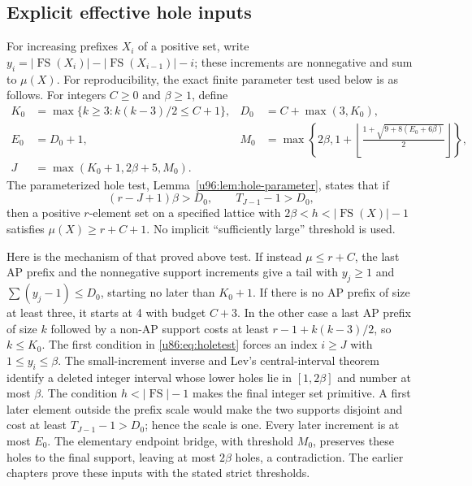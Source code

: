 \documentclass[11pt,a4paper]{article}
\theoremstyle{remark}
\newcommand{\FS}{\operatorname{FS}}
\begin{document}
\subsection{Explicit effective hole inputs}
For increasing prefixes $X_i$ of a positive set, write
$y_i=|\FS(X_i)|-|\FS(X_{i-1})|-i$; these increments are nonnegative
and sum to $\mu(X)$. For reproducibility, the exact finite parameter
test used below is as follows. For integers $C\ge0$ and $\beta\ge1$, define
\begin{align*}
 K_0&=\max\{k\ge3:k(k-3)/2\le C+1\},&D_0&=C+\max(3,K_0),\\
 E_0&=D_0+1,&
 M_0&=\max\left\{2\beta,1+\left\lfloor
 \frac{1+\sqrt{9+8(E_0+6\beta)}}2\right\rfloor\right\},\\
 J&=\max(K_0+1,2\beta+5,M_0).
\end{align*}
The parameterized hole test, Lemma~\ref{u96:lem:hole-parameter}, states
that if
\begin{equation}\label{u86:eq:holetest}
 (r-J+1)\beta>D_0,\qquad T_{J-1}-1>D_0,
\end{equation}
then a positive $r$-element set on a specified lattice with
$2\beta<h<|\FS(X)|-1$ satisfies $\mu(X)\ge r+C+1$.
No implicit ``sufficiently large'' threshold is used.

Here is the mechanism of that proved above test. If instead
$\mu\le r+C$, the last AP prefix and the nonnegative support increments
give a tail with $y_j\ge1$ and $\sum(y_j-1)\le D_0$, starting no later
than $K_0+1$. If there is no AP prefix of size at least three, it starts
at 4 with budget $C+3$. In the other case a last AP prefix of size $k$
followed by a non-AP support costs at least $r-1+k(k-3)/2$, so $k\le K_0$.
The first condition in \eqref{u86:eq:holetest} forces an index $i\ge J$ with
$1\le y_i\le\beta$. The small-increment inverse and Lev's
central-interval theorem \cite{Lev1998} identify a deleted integer interval
whose lower holes lie in $[1,2\beta]$ and number at most $\beta$.
The condition $h<|\FS|-1$ makes the final integer set primitive. A first
later element outside the prefix scale would make the two supports
disjoint and cost at least $T_{J-1}-1>D_0$; hence the scale is one.
Every later increment is at most $E_0$. The elementary endpoint bridge,
with threshold $M_0$, preserves these holes to the final support, leaving
at most $2\beta$ holes, a contradiction. The earlier chapters prove these inputs with the stated strict
thresholds.
\end{document}
